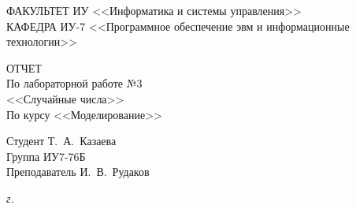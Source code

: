 \begin{titlepage}
	{
		\small \raggedright
		ФАКУЛЬТЕТ ИУ <<Информатика и системы управления>> \\
		\vspace{3.3mm}
		КАФЕДРА ИУ-7 <<Программное обеспечение эвм и информационные технологии>> \\
	}

	\vspace{15.8mm}

	{
		\LARGE
		ОТЧЕТ \\
	}
	\vspace{5mm}
	{
		\large
		По лабораторной работе №3 \\
		\vspace{2mm}
		<<Случайные числа>> \\
		\vspace{2mm}
		По курсу <<Моделирование>>
	}

	\vfill

	Студент \hspace*{2.5cm} \hfill  Т.~А.~Казаева\\
	Группа \hspace*{2.5cm} \hfill  	ИУ7-76Б\\
	Преподаватель \hspace*{2.5cm} \hfill  И.~В.~Рудаков\\
	
	
	\vspace{20mm}
	
	\textit{{\the\year} г.}
	
\end{titlepage}